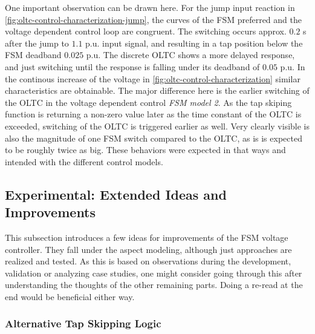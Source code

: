 One important observation can be drawn here.
For the jump input reaction in \autoref{fig:oltc-control-characterization-jump}, the curves of the \acs{FSM} preferred and the voltage dependent control loop are congruent.
The switching occurs approx. $0.2$ s after the jump to $1.1$ p.u. input signal, and resulting in a tap position below the \acs{FSM} deadband $0.025$ p.u.
The discrete \acs{OLTC} shows a more delayed response, and just switching until the response is falling under its deadband of $0.05$ p.u.
In the continous increase of the voltage in \autoref{fig:oltc-control-characterization} similar characteristics are obtainable.
The major difference here is the earlier switching of the \acs{OLTC} in the voltage dependent control \textit{FSM model 2}.
As the tap skiping function is returning a non-zero value later as the time constant of the \acs{OLTC} is exceeded, switching of the \acs{OLTC} is triggered earlier as well.
Very clearly visible is also the magnitude of one \acs{FSM} switch compared to the \acs{OLTC}, as is is expected to be roughly twice as big.
These behaviors were expected in that ways and intended with the different control models.

\subsection{Experimental: Extended Ideas and Improvements}
\label{sec:experimental-modeling}

This subsection introduces a few ideas for improvements of the \acs{FSM} voltage controller.
They fall under the aspect modeling, although just approaches are realized and tested.
As this is based on observations during the development, validation or analyzing case studies, one might consider going through this after understanding the thoughts of the other remaining parts.
Doing a re-read at the end would be beneficial either way.   

\subsubsection{Alternative Tap Skipping Logic}
\label{sec:modeling-alt-tap-skip}

